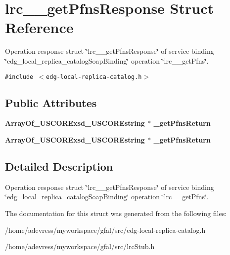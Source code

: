 \section{lrc\_\-\_\-get\-Pfns\-Response Struct Reference}
\label{structlrc____getPfnsResponse}
Operation response struct \char`\"{}lrc\_\-\_\-get\-Pfns\-Response\char`\"{} of service binding \char`\"{}edg\_\-local\_\-replica\_\-catalog\-Soap\-Binding\char`\"{} operation \char`\"{}lrc\_\-\_\-get\-Pfns\char`\"{}.  


{\tt \#include $<$edg-local-replica-catalog.h$>$}

\subsection*{Public Attributes}
\begin{CompactItemize}
\item 
\bf{Array\-Of\_\-USCORExsd\_\-USCOREstring} $\ast$ \textbf{\_\-get\-Pfns\-Return}\label{structlrc____getPfnsResponse_9621cb25f356e31c6b34e24163927b22}

\item 
\bf{Array\-Of\_\-USCORExsd\_\-USCOREstring} $\ast$ \textbf{\_\-get\-Pfns\-Return}\label{structlrc____getPfnsResponse_9621cb25f356e31c6b34e24163927b22}

\end{CompactItemize}


\subsection{Detailed Description}
Operation response struct \char`\"{}lrc\_\-\_\-get\-Pfns\-Response\char`\"{} of service binding \char`\"{}edg\_\-local\_\-replica\_\-catalog\-Soap\-Binding\char`\"{} operation \char`\"{}lrc\_\-\_\-get\-Pfns\char`\"{}. 



The documentation for this struct was generated from the following files:\begin{CompactItemize}
\item 
/home/adevress/myworkspace/gfal/src/edg-local-replica-catalog.h\item 
/home/adevress/myworkspace/gfal/src/lrc\-Stub.h\end{CompactItemize}
